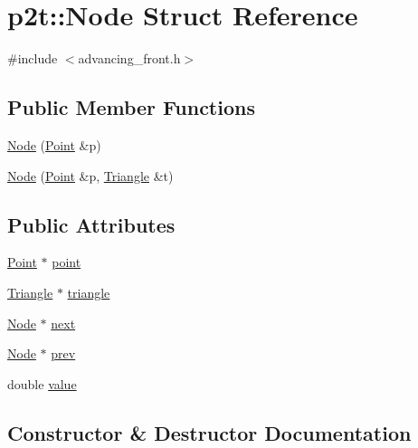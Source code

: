 \hypertarget{structp2t_1_1_node}{}\section{p2t\+:\+:Node Struct Reference}
\label{structp2t_1_1_node}


{\ttfamily \#include $<$advancing\+\_\+front.\+h$>$}

\subsection*{Public Member Functions}
\begin{DoxyCompactItemize}
\item 
\hyperlink{structp2t_1_1_node_a552fce8408e77734916d24f49a2554ee}{Node} (\hyperlink{structp2t_1_1_point}{Point} \&p)
\item 
\hyperlink{structp2t_1_1_node_ae8a123fb34395a84c2c3909240650119}{Node} (\hyperlink{structp2t_1_1_point}{Point} \&p, \hyperlink{classp2t_1_1_triangle}{Triangle} \&t)
\end{DoxyCompactItemize}
\subsection*{Public Attributes}
\begin{DoxyCompactItemize}
\item 
\hyperlink{structp2t_1_1_point}{Point} $\ast$ \hyperlink{structp2t_1_1_node_a1b991bf50dfcbc2bf3965e4a9d20c6b7}{point}
\item 
\hyperlink{classp2t_1_1_triangle}{Triangle} $\ast$ \hyperlink{structp2t_1_1_node_a272db6142d5d20b8f5157a084cae6a5b}{triangle}
\item 
\hyperlink{structp2t_1_1_node}{Node} $\ast$ \hyperlink{structp2t_1_1_node_a4ed6924b245e577926ddcf9471333468}{next}
\item 
\hyperlink{structp2t_1_1_node}{Node} $\ast$ \hyperlink{structp2t_1_1_node_a2b0cd5c3882bb383a5180472d81cb39c}{prev}
\item 
double \hyperlink{structp2t_1_1_node_adcf1fe932052b232ec31204eccef031a}{value}
\end{DoxyCompactItemize}


\subsection{Constructor \& Destructor Documentation}
\hypertarget{structp2t_1_1_node_a552fce8408e77734916d24f49a2554ee}{}

